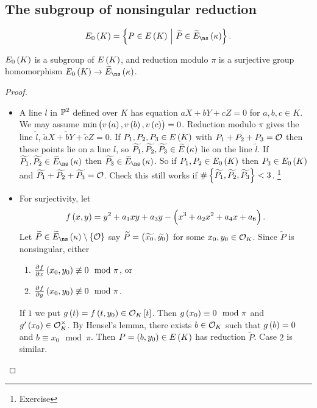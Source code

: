 \subsection{The subgroup of nonsingular reduction}


\begin{definition*}
$$ E_0\br{K} = \cbr{P \in E\br{K} \st \widetilde{P} \in \widetilde{E}_{\ns}\br{\kappa}}. $$
\end{definition*}

\begin{proposition}
\label{prop:9.5}
$ E_0\br{K} $ is a subgroup of $ E\br{K} $, and reduction modulo $ \pi $ is a surjective group homomorphism $ E_0\br{K} \to \widetilde{E}_{\ns}\br{\kappa} $.
\end{proposition}

\begin{proof}
\hfill
\begin{itemize}
\item A line $ l $ in $ \mathbb{P}^2 $ defined over $ K $ has equation $ aX + bY + cZ = 0 $ for $ a, b, c \in K $. We may assume $ \min\br{v\br{a}, v\br{b}, v\br{c}} = 0 $. Reduction modulo $ \pi $ gives the line $ \widetilde{l} $, $ \widetilde{a}X + \widetilde{b}Y + \widetilde{c}Z = 0 $. If $ P_1, P_2, P_3 \in E\br{K} $ with $ P_1 + P_2 + P_3 = \mathcal{O} $ then these points lie on a line $ l $, so $ \widetilde{P_1}, \widetilde{P_2}, \widetilde{P_3} \in \widetilde{E}\br{\kappa} $ lie on the line $ \widetilde{l} $. If $ \widetilde{P_1}, \widetilde{P_2} \in \widetilde{E}_{\ns}\br{\kappa} $ then $ \widetilde{P_3} \in \widetilde{E}_{\ns}\br{\kappa} $. So if $ P_1, P_2 \in E_0\br{K} $ then $ P_3 \in E_0\br{K} $ and $ \widetilde{P_1} + \widetilde{P_2} + \widetilde{P_3} = \mathcal{O} $. Check this still works if $ \#\cbr{\widetilde{P_1}, \widetilde{P_2}, \widetilde{P_3}} < 3 $. \footnote{Exercise}

\pagebreak

\item For surjectivity, let
$$ f\br{x, y} = y^2 + a_1xy + a_3y - \br{x^3 + a_2x^2 + a_4x + a_6}. $$
Let $ \widetilde{P} \in \widetilde{E}_{\ns}\br{\kappa} \setminus \cbr{\OOO} $ say $ \widetilde{P} = \br{\widetilde{x_0}, \widetilde{y_0}} $ for some $ x_0, y_0 \in \mathcal{O}_K $. Since $ \widetilde{P} $ is nonsingular, either
\begin{enumerate}
\item $ \tpd{f}{x}\br{x_0, y_0} \not\equiv 0 \mod \pi $, or
\item $ \tpd{f}{y}\br{x_0, y_0} \not\equiv 0 \mod \pi $.
\end{enumerate}
If $ 1 $ we put $ g\br{t} = f\br{t, y_0} \in \OOO_K\sbr{t} $. Then $ g\br{x_0} \equiv 0 \mod \pi $ and $ g'\br{x_0} \in \OOO_K^\times $. By Hensel's lemma, there exists $ b \in \mathcal{O}_K $ such that $ g\br{b} = 0 $ and $ b \equiv x_0 \mod \pi $. Then $ P = \br{b, y_0} \in E\br{K} $ has reduction $ \widetilde{P} $. Case $ 2 $ is similar.
\end{itemize}
\end{proof}

